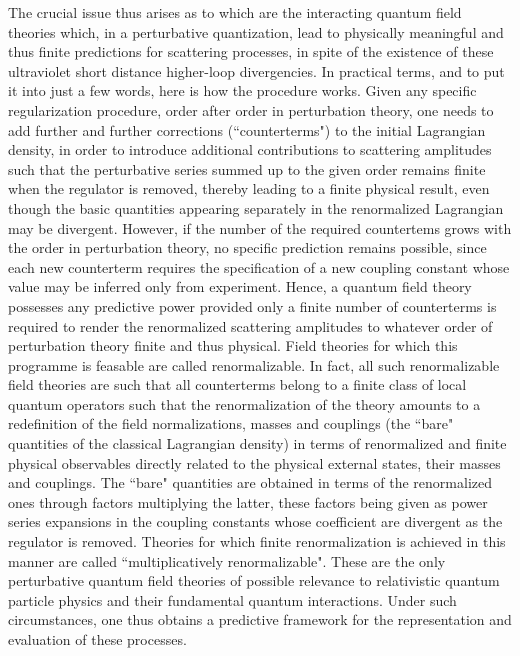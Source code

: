 \documentclass[a4paper,11pt]{article}
\begin{document}
The crucial issue thus arises as to which are the interacting quantum
field theories which, in a perturbative quantization, lead to physically
meaningful and thus finite predictions for scattering processes, in spite of
the existence of these ultraviolet short distance higher-loop divergencies.
In practical terms, and to put it into just a few words, here is how the
procedure works. Given any specific regularization procedure, order after
order in perturbation theory, one needs to add further and further
corrections (``counterterms") to the initial Lagrangian density,
in order to introduce additional contributions to scat\-te\-ring amplitudes
such that the perturbative series summed up to the given order remains
finite when the regulator is removed, thereby leading to a finite physical
result, even though the basic quantities appearing separately in the
renormalized Lagrangian may be divergent. However, if the number of the
required countertems grows with the order in perturbation theory, no
specific prediction remains possible, since each new counterterm requires
the specification of a new coupling constant whose value may be inferred
only from experiment. Hence, a quantum field theory possesses any predictive
power provided only a finite number of counterterms is required to render
the renormalized scattering amplitudes to whatever order of perturbation
theory finite and thus physical. Field theories for which this programme is 
feasable are called renormalizable. In fact, all such renormalizable field 
theories are such that all counterterms belong to a finite class of local
quantum operators such that the renormalization of the
theory amounts to a redefinition of the field normalizations, masses and 
couplings (the ``bare" quantities of the classical Lagrangian density) in 
terms of renormalized and finite physical observables directly related to 
the physical external states, their masses and couplings. The ``bare" 
quantities are obtained in terms of the re\-nor\-ma\-li\-zed 
ones through factors multiplying the latter, these factors
being given as power series expansions in the coupling constants whose
coefficient are divergent as the regulator is removed. Theories for
which finite renormalization is achieved in this manner are called
``multiplicatively renormalizable". These are the only perturbative
quantum field theories of possible relevance to relativistic quantum 
particle physics and their fundamental quantum interactions. Under such
circumstances, one thus obtains a predictive framework for the
representation and evaluation of these processes.
\end{document}
